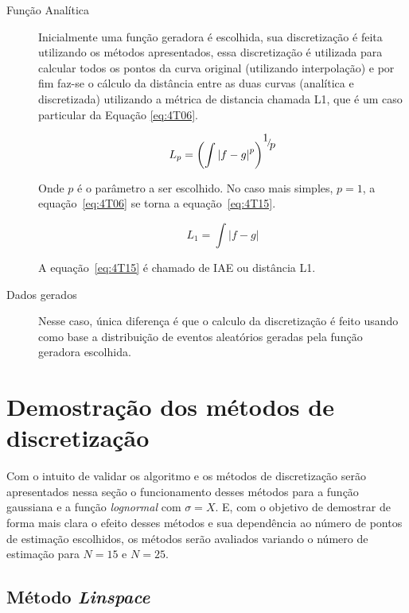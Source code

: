 \begin{description}
	\item[Função Analítica] Inicialmente uma função geradora é escolhida, sua discretização é feita utilizando os métodos apresentados, essa discretização é utilizada para calcular todos os pontos da curva original (utilizando interpolação) e por fim faz-se o cálculo da distância entre as duas curvas (analítica e discretizada) utilizando a métrica de distancia chamada L1, que é um caso particular da Equação \eqref{eq:4T06}.
	
	\begin{equation}\label{eq:4T06}
	{L_p} = {\left( {\int {{{\left| {f - g} \right|}^p}} } \right)^{{\raise0.7ex\hbox{$1$} \!\mathord{\left/
					{\vphantom {1 p}}\right.\kern-\nulldelimiterspace}
				\!\lower0.7ex\hbox{$p$}}}}
	\end{equation}
	
	Onde $p$ é o parâmetro a ser escolhido. No caso mais simples, $p=1$, a equação~\ref{eq:4T06} se torna a equação~\ref{eq:4T15}.
	
	\begin{equation}\label{eq:4T15}
	{L_1} = {\int {\left| {f - g} \right|} }
	\end{equation}
	
	A equação~\ref{eq:4T15} é chamado de \ac{IAE} ou distância L1.
	
	\item[Dados gerados] Nesse caso, única diferença é que o calculo da discretização é feito usando como base a distribuição de eventos aleatórios geradas pela função geradora escolhida.
\end{description}


\section{Demostração dos métodos de discretização}

Com o intuito de validar os algoritmo e os métodos de discretização serão apresentados nessa seção o funcionamento desses métodos para a função gaussiana e a função \textit{lognormal} com $\sigma = X$. E, com o objetivo de demostrar de forma mais clara o efeito desses métodos e sua dependência ao número de pontos de estimação escolhidos, os métodos serão avaliados variando o número de estimação para $ N = 15 $ e $ N = 25 $.

\subsection{Método \textit{Linspace}}

